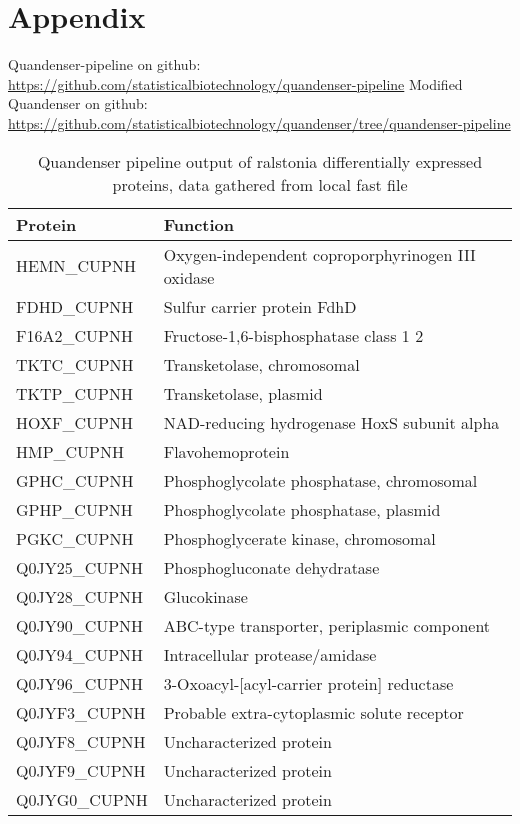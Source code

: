 \section{Appendix}

Quandenser-pipeline on github: \url{https://github.com/statisticalbiotechnology/quandenser-pipeline}
Modified Quandenser on github: \url{https://github.com/statisticalbiotechnology/quandenser/tree/quandenser-pipeline}


\begin{center}
\begin{longtable}{ l l }
\caption{Quandenser pipeline output of ralstonia differentially expressed proteins, data gathered from local fast file}
\toprule
Protein & Function \\ [0.5ex] \midrule
HEMN\_CUPNH & Oxygen-independent coproporphyrinogen III oxidase \\ [0.5ex]
FDHD\_CUPNH & Sulfur carrier protein FdhD \\ [0.5ex]
F16A2\_CUPNH & Fructose-1,6-bisphosphatase class 1 2 \\ [0.5ex]
TKTC\_CUPNH & Transketolase, chromosomal \\ [0.5ex]
TKTP\_CUPNH & Transketolase, plasmid \\ [0.5ex]
HOXF\_CUPNH & NAD-reducing hydrogenase HoxS subunit alpha \\ [0.5ex]
HMP\_CUPNH & Flavohemoprotein \\ [0.5ex]
GPHC\_CUPNH & Phosphoglycolate phosphatase, chromosomal \\ [0.5ex]
GPHP\_CUPNH & Phosphoglycolate phosphatase, plasmid \\ [0.5ex]
PGKC\_CUPNH & Phosphoglycerate kinase, chromosomal \\ [0.5ex]
Q0JY25\_CUPNH & Phosphogluconate dehydratase \\ [0.5ex]
Q0JY28\_CUPNH & Glucokinase \\ [0.5ex]
Q0JY90\_CUPNH & ABC-type transporter, periplasmic component \\ [0.5ex]
Q0JY94\_CUPNH & Intracellular protease/amidase \\ [0.5ex]
Q0JY96\_CUPNH & 3-Oxoacyl-[acyl-carrier protein] reductase \\ [0.5ex]
Q0JYF3\_CUPNH & Probable extra-cytoplasmic solute receptor \\ [0.5ex]
Q0JYF8\_CUPNH & Uncharacterized protein \\ [0.5ex]
Q0JYF9\_CUPNH & Uncharacterized protein \\ [0.5ex]
Q0JYG0\_CUPNH & Uncharacterized protein \\ [0.5ex]

\end{longtable}
\end{center}
